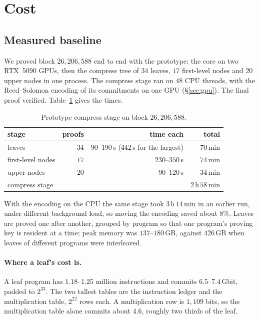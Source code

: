\section{Cost}\label{sec:cost}

\subsection{Measured baseline}\label{sec:cost-baseline}

We proved block $26{,}206{,}588$ end to end with the prototype: the \Blake{} core on two RTX~5090 GPUs, then the compress tree of $34$ leaves, $17$ first-level nodes and $20$ upper nodes in one process. The compress stage ran on $48$ CPU threads, with the Reed--Solomon encoding of its commitments on one GPU (\S\ref{sec:gpu}). The final proof verified. Table~\ref{tab:baseline} gives the times.

\begin{table}[t]
\centering\small
\caption{Prototype compress stage on block $26{,}206{,}588$.}
\label{tab:baseline}
\begin{tabular}{lrrr}
\toprule
stage & proofs & time each & total \\
\midrule
leaves & $34$ & $90$--$190$\,s ($442$\,s for the largest) & $70$\,min \\
first-level nodes & $17$ & $230$--$350$\,s & $74$\,min \\
upper nodes & $20$ & $90$--$120$\,s & $34$\,min \\
\midrule
compress stage & & & $2$\,h\,$58$\,min \\
\bottomrule
\end{tabular}
\end{table}

With the encoding on the CPU the same stage took $3$\,h\,$14$\,min in an earlier run, under different background load, so moving the encoding saved about $8\%$. Leaves are proved one after another, grouped by program so that one program's proving key is resident at a time; peak memory was $137$--$180$\,GB, against $426$\,GB when leaves of different programs were interleaved.

\paragraph{Where a leaf's cost is.} A leaf program has $1.18$--$1.25$ million instructions and commits $6.5$--$7.4$\,Gbit, padded to $2^{33}$. The two tallest tables are the instruction ledger and the \KB{} multiplication table, $2^{22}$ rows each. A multiplication row is $1{,}109$ bits, so the multiplication table alone commits about $4.6$\Gbit{}, roughly two thirds of the leaf.

